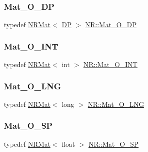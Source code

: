 \mbox{\label{namespaceNR_adc1f8da33094b6bbeb1f5f899515ce54}} 
\subsubsection{\texorpdfstring{Mat\_O\_DP}{Mat\_O\_DP}}
{\footnotesize\ttfamily typedef \mbox{\hyperlink{classNR_1_1NRMat}{N\+R\+Mat}}$<$ \mbox{\hyperlink{namespaceNR_af6ff762dd605ff477b8e52387253a02a}{DP}} $>$ \mbox{\hyperlink{namespaceNR_adc1f8da33094b6bbeb1f5f899515ce54}{N\+R\+::\+Mat\+\_\+\+O\+\_\+\+DP}}}

\mbox{\label{namespaceNR_aec8b2e2473f3c741647c723acc1fc6d6}} 
\subsubsection{\texorpdfstring{Mat\_O\_INT}{Mat\_O\_INT}}
{\footnotesize\ttfamily typedef \mbox{\hyperlink{classNR_1_1NRMat}{N\+R\+Mat}}$<$ int $>$ \mbox{\hyperlink{namespaceNR_aec8b2e2473f3c741647c723acc1fc6d6}{N\+R\+::\+Mat\+\_\+\+O\+\_\+\+I\+NT}}}

\mbox{\label{namespaceNR_a45b2c8ac10b33b50d1c39bbb7f5be21c}} 
\subsubsection{\texorpdfstring{Mat\_O\_LNG}{Mat\_O\_LNG}}
{\footnotesize\ttfamily typedef \mbox{\hyperlink{classNR_1_1NRMat}{N\+R\+Mat}}$<$ long $>$ \mbox{\hyperlink{namespaceNR_a45b2c8ac10b33b50d1c39bbb7f5be21c}{N\+R\+::\+Mat\+\_\+\+O\+\_\+\+L\+NG}}}

\mbox{\label{namespaceNR_a1f43923ad3dc2cee2dc76f0af4dc1ad3}} 
\subsubsection{\texorpdfstring{Mat\_O\_SP}{Mat\_O\_SP}}
{\footnotesize\ttfamily typedef \mbox{\hyperlink{classNR_1_1NRMat}{N\+R\+Mat}}$<$ float $>$ \mbox{\hyperlink{namespaceNR_a1f43923ad3dc2cee2dc76f0af4dc1ad3}{N\+R\+::\+Mat\+\_\+\+O\+\_\+\+SP}}}

